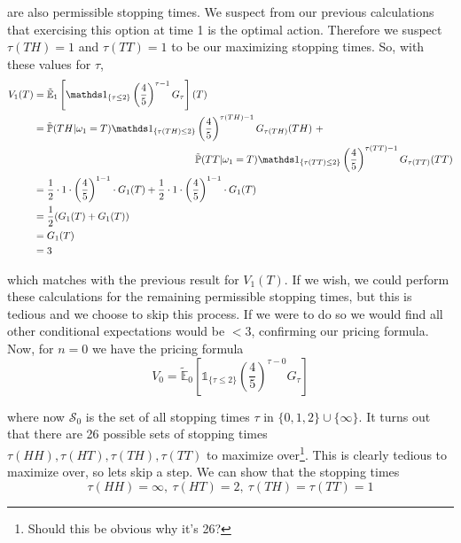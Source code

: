 \documentclass[12pt]{article}
\renewcommand{\P}{\mathbb P}
\newcommand{\E}{\mathbb E}
\begin{document}
are also permissible stopping times. We suspect from our previous calculations that exercising this option at time 1 is the optimal action. Therefore we suspect $\tau(TH) = 1$ and $\tau(TT) = 1$ to be our maximizing stopping times. So, with these values for $\tau$,
\begin{align*}
	V_1(T) &= \tilde{\E}_1 \left[ \mathds 1_{\{\tau \leq 2\}} \left(\frac{4}{5}\right)^{\tau - 1} G_{\tau} \right](T) \\
	&= \tilde{\P}(TH|\omega_1 = T)\mathds 1_{\{\tau(TH) \leq 2\}} \left(\frac{4}{5}\right)^{\tau(TH) - 1}G_{\tau(TH)}(TH)~+  \\
	&\hphantom{{}={---------------}} \tilde{\P}(TT|\omega_1 = T)\mathds 1_{\{\tau(TT) \leq 2\}} \left(\frac{4}{5}\right)^{\tau(TT) - 1}G_{\tau(TT)}(TT) \\
	&= \frac{1}{2}\cdot1\cdot\left(\frac{4}{5}\right)^{1 - 1}\cdot G_1(T) + \frac{1}{2}\cdot1\cdot\left(\frac{4}{5}\right)^{1 - 1}\cdot G_1(T)  \\
	&= \frac{1}{2}(G_1(T) + G_1(T)) \\
	&= G_1(T) \\
	&= 3
\end{align*}

which matches with the previous result for $V_1(T)$. If we wish, we could perform these calculations for the remaining permissible stopping times, but this is tedious and we choose to skip this process. If we were to do so we would find all other conditional expectations would be $< 3$, confirming our pricing formula. Now, for $n = 0$ we have the pricing formula
\begin{equation*}
	V_0 = \tilde{\E}_0 \left[ \mathds 1_{\{\tau \leq 2\}} \left(\frac{4}{5}\right)^{\tau - 0} G_{\tau} \right] 
\end{equation*}

where now $\mathcal S_0$ is the set of all stopping times $\tau$ in $\{0,1,2\}\cup\{\infty\}$. It turns out that there are 26 possible sets of stopping times $\tau(HH),\tau(HT),\tau(TH),\tau(TT)$ to maximize over\footnote{Should this be obvious why it's 26?}. This is clearly tedious to maximize over, so lets skip a step. We can show that the stopping times
\begin{equation*}
	\tau(HH) = \infty,~\tau(HT) = 2,~\tau(TH) = \tau(TT) = 1
\end{equation*}
\end{document}
